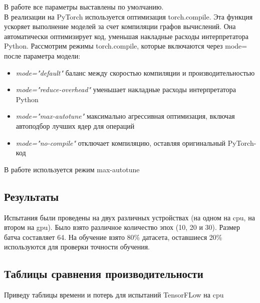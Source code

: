 \documentclass[a4paper,12pt,titlepage,final]{article}
\begin{document}
В работе все параметры выставлены по умолчанию.\\

В реализации на PyTorch используется оптимизация torch.compile. Эта функция ускоряет выполнение моделей за счет компиляции графов вычислений. Она автоматически оптимизирует код, уменьшая накладные расходы интерпретатора Python. Рассмотрим режимы torch.compile, которые включаются через mode= после параметра модели:
\begin{itemize}
    \item \textit{mode="default"} баланс между скоростью компиляции и производительностью
    \item \textit{mode="reduce-overhead"} уменьшает накладные расходы интерпретатора Python
    \item \textit{mode="max-autotune"} максимально агрессивная оптимизация, включая автоподбор лучших ядер для операций
    \item \textit{mode="no-compile"} отключает компиляцию, оставляя оригинальный PyTorch-код
\end{itemize}

В работе используется режим max-autotune
\newpage
\begin{center}
    \item \section{Результаты}
\end{center}
Испытания были проведены на двух различных устройствах (на одном на cpu, на втором на gpu). Было взято различное количество эпох (10, 20 и 30). Размер батча составляет 64. На обучение взято 80\% датасета, оставшиеся 20\% используются для проверки точности обучения.

\begin{center}
    \item \subsection{Таблицы сравнения производительности}
\end{center}

Приведу таблицы времени и потерь для испытаний TensorFLow на cpu
\end{document}
